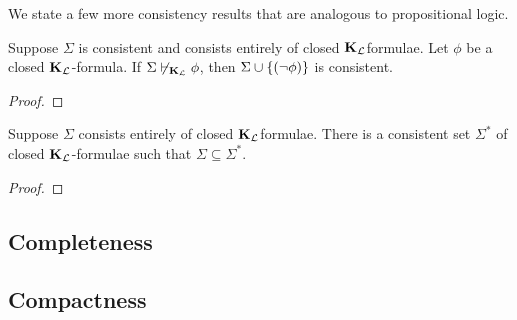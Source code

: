 We state a few more consistency results that are analogous to propositional logic.

\begin{boxproposition}
    Suppose $\Sigma$ is consistent and consists entirely of closed $\mathbf{K}_{\mathcal{L}}$formulae. Let $\phi$ be a closed $\mathbf{K}_{\mathcal{L}}$-formula. If $\Sigma \not\vdash_{\mathbf{K}_{\mathcal{L}}} \phi$, then $\Sigma \cup \left\{ \left( \neg \phi \right) \right\}$ is consistent.
\end{boxproposition}
\begin{proof}
    \sorry %
\end{proof}

\begin{boxproposition}
    Suppose $\Sigma$ consists entirely of closed $\mathbf{K}_{\mathcal{L}}$formulae. There is a consistent set $\Sigma^*$ of closed $\mathbf{K}_{\mathcal{L}}$-formulae such that $\Sigma \subseteq \Sigma^*$.
\end{boxproposition}
\begin{proof}
    \sorry %
\end{proof}



\subsection{Completeness}

\subsection{Compactness}
